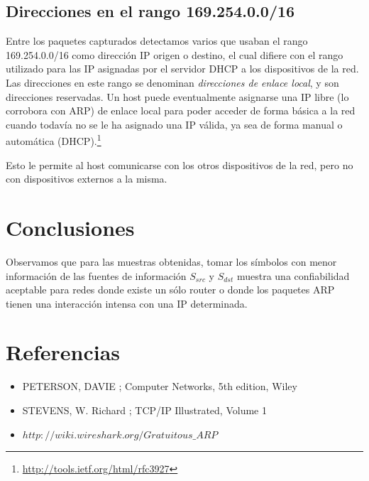 \documentclass[10pt, a4paper]{article}
\begin{document}
\subsection{Direcciones en el rango 169.254.0.0/16}

Entre los paquetes capturados detectamos varios que usaban el rango 169.254.0.0/16 como dirección IP origen o destino, el cual difiere con el rango utilizado para las IP asignadas por el servidor DHCP a los dispositivos de la red. Las direcciones en este rango se denominan \textit{direcciones de enlace local}, y son direcciones reservadas. Un host puede eventualmente asignarse una IP libre (lo corrobora con ARP) de enlace local para poder acceder de forma básica a la red cuando todavía no se le ha asignado una IP válida, ya sea de forma manual o automática (DHCP).\footnote{\url{http://tools.ietf.org/html/rfc3927}}

Esto le permite al host comunicarse con los otros dispositivos de la red, pero no con dispositivos externos a la misma.

\section{Conclusiones}
Observamos que para las muestras obtenidas, tomar los símbolos con menor información de las fuentes de información $S_{src}$ y $S_{dst}$ muestra una confiabilidad aceptable para redes donde existe un sólo router o donde los paquetes ARP tienen una interacción intensa con una IP determinada.

\section{Referencias}
\begin{itemize}
\item PETERSON, DAVIE ; Computer Networks, 5th edition, Wiley
\item STEVENS, W. Richard ; TCP/IP Illustrated, Volume 1

\item $http://wiki.wireshark.org/Gratuitous\_ARP$
\end{itemize}
\end{document}
